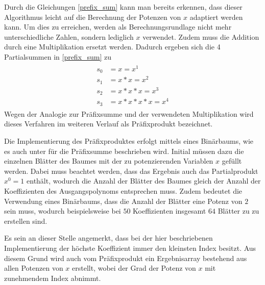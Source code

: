 Durch die Gleichungen \eqref{prefix_sum} kann man bereits erkennen, dass dieser Algorithmus leicht auf die Berechnung der Potenzen von $x$ adaptiert werden kann. Um dies zu erreichen, werden als Berechnungsrundlage nicht mehr unterschiedliche Zahlen, sondern lediglich $x$ verwendet. Zudem muss die Addition durch eine Multiplikation ersetzt werden. Dadurch ergeben sich die 4 Partialsummen in \eqref{prefix_sum} zu
\begin{align}\label{prefix_x_prod}
\begin{split}
s_0 &= x = x^1 \\
s_1 &= x * x = x^2 \\
s_2 &= x * x * x = x^3 \\
s_3 &= x * x * x * x = x^4
\end{split}
\end{align}
Wegen der Analogie zur Präfixsumme und der verwendeten Multiplikation wird dieses Verfahren im weiteren Verlauf als Präfixprodukt bezeichnet.

Die Implementierung des Präfixproduktes erfolgt mittels eines Binärbaums, wie es auch unter \cite{Harris:2014} für die Präfixsumme beschrieben wird. Initial müssen dazu die einzelnen Blätter des Baumes mit der zu potenzierenden Variablen $x$ gefüllt werden. Dabei muss beachtet werden, dass das Ergebnis auch das Partialprodukt $x^0 = 1$ enthält, wodurch die Anzahl der Blätter des Baumes gleich der Anzahl der Koeffizienten des Ausgangspolynoms entsprechen muss. Zudem bedeutet die Verwendung eines Binärbaums, dass die Anzahl der Blätter eine Potenz von $2$ sein muss, wodurch beispielsweise bei $50$ Koeffizienten insgesamt $64$ Blätter zu zu erstellen sind.\newline

Es sein an dieser Stelle angemerkt, dass bei der hier beschriebenen Implementierung der höchste Koeffizient immer den kleinsten Index besitzt. Aus diesem Grund wird auch vom Präfixprodukt ein Ergebnisarray bestehend aus allen Potenzen von $x$ erstellt, wobei der Grad der Potenz von $x$ mit zunehmendem Index abnimmt.\newline

